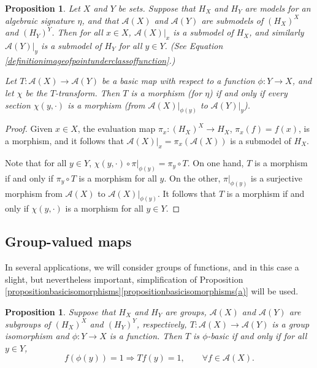 \documentclass[letter,11pt]{amsart}
\theoremstyle{plain}		\newtheorem{theorem}[generalnumbering]{Theorem}
\theoremstyle{plain}		\newtheorem{corollary}[generalnumbering]{Corollary}
\theoremstyle{definition}		\newtheorem{definition}[generalnumbering]{Definition}
\theoremstyle{definition}		\newtheorem{example}[generalnumbering]{Example}
\theoremstyle{plain}		\newtheorem{proposition}[generalnumbering]{Proposition}
\theoremstyle{plain}		\newtheorem{lemma}[generalnumbering]{Lemma}
\theoremstyle{plain}    \newtheorem{plainstyle}[generalnumbering]{\namefordifferentenvironment}
\theoremstyle{plain}    \newtheorem*{plainstyle*}{\namefordifferentenvironment}
\theoremstyle{definition}    \newtheorem{definitionstyle}[generalnumbering]{\namefordifferentenvironment}
\theoremstyle{definition}    \newtheorem*{definitionstyle*}{\namefordifferentenvironment}
\begin{document}
\begin{proposition}\label{propositionmodelmorphism}
	Let $X$ and $Y$ be sets. Suppose that $H_X$ and $H_Y$ are models for an algebraic signature $\eta$, and that $\mathcal{A}(X)$ and $\mathcal{A}(Y)$ are submodels of $(H_X)^X$ and $(H_Y)^Y$. Then for all $x\in X$, $\mathcal{A}(X)|_x$ is a submodel of $H_X$, and similarly $\mathcal{A}(Y)|_y$ is a submodel of $H_Y$ for all $y\in Y$. (See Equation \eqref{definitionimageofpointunderclassoffunction}.)
	
	Let $T\colon\mathcal{A}(X)\to\mathcal{A}(Y)$ be a basic map with respect to a function $\phi\colon Y\to X$, and let $\chi$ be the $T$-transform. Then $T$ is a morphism (for $\eta$) if and only if every section $\chi(y,\cdot)$ is a morphism (from $\mathcal{A}(X)|_{\phi(y)}$ to $\mathcal{A}(Y)|_y$).
\end{proposition}
\begin{proof}
	Given $x\in X$, the evaluation map $\pi_x\colon(H_X)^X\to H_X$, $\pi_x(f)=f(x)$, is a morphism, and it follows that $\mathcal{A}(X)|_x=\pi_x(\mathcal{A}(X))$ is a submodel of $H_X$.
	
	Note that for all $y\in Y$, $\chi(y,\cdot)\circ\pi|_{\phi(y)}=\pi_y\circ T$. On one hand, $T$ is a morphism if and only if $\pi_y\circ T$ is a morphism for all $y$. On the other, $\pi|_{\phi(y)}$ is a surjective morphism from $\mathcal{A}(X)$ to $\mathcal{A}(X)|_{\phi(y)}$. It follows that $T$ is a morphism if and only if $\chi(y,\cdot)$ is a morphism for all $y\in Y$.\qedhere
\end{proof}

\subsection{Group-valued maps}\label{subsectiongroupvaluedmaps}

In several applications, we will consider groups of functions, and in this case a slight, but nevertheless important, simplification of Proposition \ref{propositionbasicisomorphisms}\ref{propositionbasicisomorphisms(a)} will be used.

\begin{proposition}\label{propositionbasicnessofgroupvalued}
	Suppose that $H_X$ and $H_Y$ are groups, $\mathcal{A}(X)$ and $\mathcal{A}(Y)$ are subgroups of $(H_X)^X$ and $(H_Y)^Y$, respectively, $T\colon\mathcal{A}(X)\to\mathcal{A}(Y)$ is a group isomorphism and $\phi\colon Y\to X$ is a function. Then $T$ is $\phi$-basic if and only if for all $y\in Y$,
	\[f(\phi(y))=1\Longrightarrow Tf(y)=1,\qquad\forall f\in\mathcal{A}(X).\]
\end{proposition}
\end{document}
